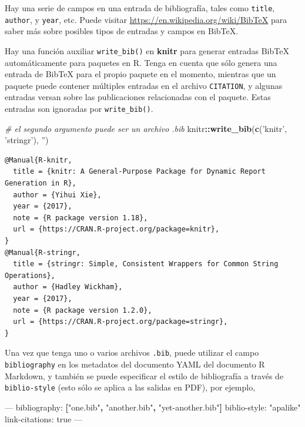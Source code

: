 \documentclass[12pt,]{krantz}
\makeatletter
\newenvironment{Shaded}{\begin{snugshade}}{\end{snugshade}}
\newcommand{\KeywordTok}[1]{\textcolor[rgb]{0.13,0.29,0.53}{\textbf{#1}}}
\newcommand{\StringTok}[1]{\textcolor[rgb]{0.31,0.60,0.02}{#1}}
\newcommand{\CommentTok}[1]{\textcolor[rgb]{0.56,0.35,0.01}{\textit{#1}}}
\newcommand{\OtherTok}[1]{\textcolor[rgb]{0.56,0.35,0.01}{#1}}
\newcommand{\FunctionTok}[1]{\textcolor[rgb]{0.00,0.00,0.00}{#1}}
\newcommand{\OperatorTok}[1]{\textcolor[rgb]{0.81,0.36,0.00}{\textbf{#1}}}
\newcommand{\AttributeTok}[1]{\textcolor[rgb]{0.77,0.63,0.00}{#1}}
\newcommand{\NormalTok}[1]{#1}
\newenvironment{kframe}{%
\medskip{}
\setlength{\fboxsep}{.8em}
 \def\at@end@of@kframe{}%
 \ifinner\ifhmode%
  \def\at@end@of@kframe{\end{minipage}}%
  \begin{minipage}{\columnwidth}%
 \fi\fi%
 \def\FrameCommand##1{\hskip\@totalleftmargin \hskip-\fboxsep
 \colorbox{shadecolor}{##1}\hskip-\fboxsep
     \hskip-\linewidth \hskip-\@totalleftmargin \hskip\columnwidth}%
 \MakeFramed {\advance\hsize-\width
   \@totalleftmargin\z@ \linewidth\hsize
   \@setminipage}}%
 {\par\unskip\endMakeFramed%
 \at@end@of@kframe}
\renewenvironment{Shaded}{\begin{kframe}}{\end{kframe}}
\theoremstyle{definition}
\theoremstyle{definition}
\theoremstyle{definition}
\theoremstyle{remark}
\makeatother
\begin{document}
Hay una serie de campos en una entrada de bibliografía, tales como
\texttt{title}, \texttt{author}, y \texttt{year}, etc. Puede visitar
\url{https://en.wikipedia.org/wiki/BibTeX} para saber más sobre posibles
tipos de entradas y campos en BibTeX.

Hay una función auxiliar \texttt{write\_bib()} en \textbf{knitr} para
generar entradas BibTeX automáticamente para paquetes en R. Tenga en
cuenta que sólo genera una entrada de BibTeX para el propio paquete en
el momento, mientras que un paquete puede contener múltiples entradas en
el archivo \texttt{CITATION}, y algunas entradas versan sobre las
publicaciones relacionadas con el paquete. Estas entradas son ignoradas
por \texttt{write\_bib()}.

\begin{Shaded}
\begin{Highlighting}[]
\CommentTok{# el segundo argumento puede ser un archivo .bib}
\NormalTok{knitr}\OperatorTok{::}\KeywordTok{write_bib}\NormalTok{(}\KeywordTok{c}\NormalTok{(}\StringTok{'knitr'}\NormalTok{, }\StringTok{'stringr'}\NormalTok{), }\StringTok{''}\NormalTok{)}
\end{Highlighting}
\end{Shaded}

\begin{verbatim}
@Manual{R-knitr,
  title = {knitr: A General-Purpose Package for Dynamic Report Generation in R},
  author = {Yihui Xie},
  year = {2017},
  note = {R package version 1.18},
  url = {https://CRAN.R-project.org/package=knitr},
}
@Manual{R-stringr,
  title = {stringr: Simple, Consistent Wrappers for Common String Operations},
  author = {Hadley Wickham},
  year = {2017},
  note = {R package version 1.2.0},
  url = {https://CRAN.R-project.org/package=stringr},
}
\end{verbatim}

Una vez que tenga uno o varios archivos \texttt{.bib}, puede utilizar el
campo \texttt{bibliography} en los metadatos del documento YAML del
documento R Markdown, y también se puede especificar el estilo de
bibliografía a través de \texttt{biblio-style} (esto sólo se aplica a
las salidas en PDF), por ejemplo,

\begin{Shaded}
\begin{Highlighting}[]
\OtherTok{---}
\FunctionTok{bibliography:}\AttributeTok{ }\KeywordTok{[}\StringTok{"one.bib"}\KeywordTok{,} \StringTok{"another.bib"}\KeywordTok{,} \StringTok{"yet-another.bib"}\KeywordTok{]}
\FunctionTok{biblio-style:}\AttributeTok{ }\StringTok{"apalike"}
\FunctionTok{link-citations:}\AttributeTok{ true}
\OtherTok{---}
\end{Highlighting}
\end{Shaded}
\end{document}
